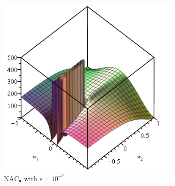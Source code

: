 

\begin{figure}[h]
\centering
\begin{subfigure}{.33\textwidth}
  \centering
  \includegraphics[width=\linewidth,trim={0 0 0 4.35cm},clip]{graphics/nac-mul-eps-1em7.png}
  \caption{$\mathrm{NAC}_{\bullet}$ with $\epsilon = 10^{-7}$}
\end{subfigure}%
\begin{subfigure}{.33\textwidth}
  \centering

\end{subfigure}
\end{figure}
